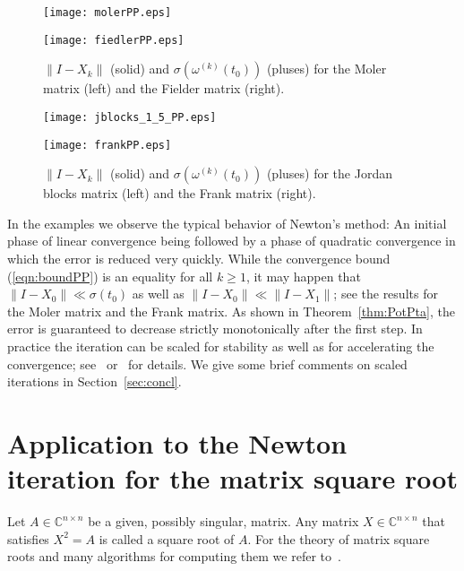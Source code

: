 \documentclass{siamltex}
\begin{document}
\begin{figure}
\begin{minipage}{0.49\linewidth}
\texttt{[image: molerPP.eps]}
\end{minipage}
\hfill
\begin{minipage}{0.49\linewidth}
\texttt{[image: fiedlerPP.eps]}
\end{minipage}
\caption{$\|I-X_k\|$ (solid) and $\sigma(\omega^{(k)}(t_0))$ (pluses) for
the Moler matrix (left) and the Fielder matrix (right).}\label{fig:1pp}
\end{figure}

\begin{figure}
\begin{minipage}{0.49\linewidth}
\texttt{[image: jblocks\_1\_5\_PP.eps]}
\end{minipage}
\hfill
\begin{minipage}{0.49\linewidth}
\texttt{[image: frankPP.eps]}
\end{minipage}
\caption{$\|I-X_k\|$ (solid) and $\sigma(\omega^{(k)}(t_0))$ (pluses) for
the Jordan blocks matrix (left) and the Frank matrix (right).}\label{fig:2pp}
\end{figure}

\smallskip
In the examples we observe the typical behavior of Newton's method: An initial phase of
linear convergence being followed by a phase of quadratic convergence in which the error is reduced
very quickly. While the convergence bound (\ref{eqn:boundPP}) is an equality for all $k\geq 1$,
it may happen that $\|I-X_0\|\ll \sigma(t_0)$ as well as $\|I-X_0\|\ll \|I-X_1\|$;
see the results for the Moler matrix and the Frank matrix. As shown in Theorem~\ref{thm:PotPta},
the error is guaranteed to decrease strictly monotonically after the first step. In practice
the iteration can be scaled for stability as well as for accelerating the convergence;
see~\cite{ByeXu08,Hig86b} or~\cite[Section~8.6]{HigBook08} for details. We give some brief
comments on scaled iterations in Section~\ref{sec:concl}.

\section{Application to the Newton iteration for the matrix square root}\label{sec:appl}

Let $A\in {\mathbb C}^{n\times n}$ be a given, possibly singular,
matrix. Any matrix $X\in {\mathbb C}^{n\times n}$
that satisfies $X^2=A$ is called a square root of $A$. For the theory of matrix square roots and
many algorithms for computing them we refer to~\cite[Chapter~6]{HigBook08}.
\end{document}
